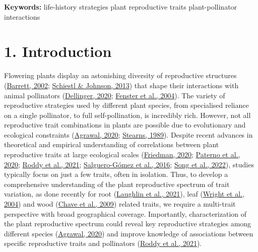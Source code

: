 \documentclass[
  12pt,
  a4paper,
]{article}
\begin{document}
\textbf{Keywords:} life-history strategies \textbar{} plant reproductive traits \textbar{} plant-pollinator interactions

\doublespacing
\vspace{5mm}
\normalsize

\hypertarget{introduction}{%
\section{1. Introduction}\label{introduction}}

Flowering plants display an astonishing diversity of reproductive structures (\protect\hyperlink{ref-barrett2002}{Barrett, 2002}; \protect\hyperlink{ref-schiestl2013}{Schiestl \& Johnson, 2013}) that shape their interactions with animal pollinators (\protect\hyperlink{ref-dellinger2020}{Dellinger, 2020}; \protect\hyperlink{ref-fenster2004}{Fenster et al., 2004}). The variety of reproductive strategies used by different plant species, from specialised reliance on a single pollinator, to full self-pollination, is incredibly rich. However, not all reproductive trait combinations in plants are possible due to evolutionary and ecological constraints (\protect\hyperlink{ref-agrawal2020}{Agrawal, 2020}; \protect\hyperlink{ref-stearns1989}{Stearns, 1989}). Despite recent advances in theoretical and empirical understanding of correlations between plant reproductive traits at large ecological scales (\protect\hyperlink{ref-friedman2020}{Friedman, 2020}; \protect\hyperlink{ref-paterno2020}{Paterno et al., 2020}; \protect\hyperlink{ref-roddy2021}{Roddy et al., 2021}; \protect\hyperlink{ref-salguero2016}{Salguero-Gómez et al., 2016}; \protect\hyperlink{ref-song2022}{Song et al., 2022}), studies typically focus on just a few traits, often in isolation. Thus, to develop a comprehensive understanding of the plant reproductive spectrum of trait variation, as done recently for root (\protect\hyperlink{ref-laughlin2021}{Laughlin et al., 2021}), leaf (\protect\hyperlink{ref-wright2004}{Wright et al., 2004}) and wood (\protect\hyperlink{ref-chave2009}{Chave et al., 2009}) related traits, we require a multi-trait perspective with broad geographical coverage. Importantly, characterization of the plant reproductive spectrum could reveal key reproductive strategies among different species (\protect\hyperlink{ref-agrawal2020}{Agrawal, 2020}) and improve knowledge of associations between specific reproductive traits and pollinators (\protect\hyperlink{ref-roddy2021}{Roddy et al., 2021}).
\end{document}
